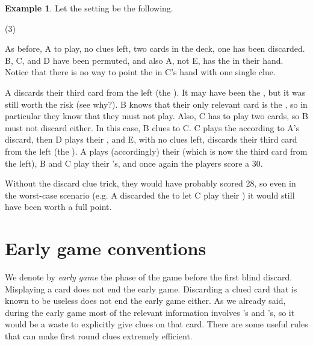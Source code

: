 \documentclass[a4paper]{article}
\theoremstyle{plain}
\theoremstyle{definition}
\newtheorem{example}[theorem]{Example}
\begin{document}
\begin{example}
	
	Let the setting be the following.
	
	\begin{tasks}(3)
		\task[+]      
		\task[A]    
		\task[B]    
		\task[C]    
		\task[D]    
		\task[E]    
	\end{tasks}
	
	As before, A to play, no clues left, two cards in the deck, one  has been discarded. B, C, and D have been permuted, and also A, not E, has the  in their hand. Notice that there is no way to point the  in C's hand with one single clue.
	
	A discards their third card from the left (the ). It may have been the , but it was still worth the risk (see why?). B knows that their only relevant card is the , so in particular they know that they must not play. Also, C has to play two cards, so B must not discard either. In this case, B clues  to C. C plays the  according to A's discard, then D plays their , and E, with no clues left, discards their third card from the left (the ). A plays (accordingly) their  (which is now the third card from the left), B and C play their 's, and once again the players score a 30.
\end{example}

Without the discard clue trick, they would have probably scored 28, so even in the worst-case scenario (e.g. A discarded the  to let C play their ) it would still have been worth a full point.

\section{Early game conventions}
\label{sec:earlygame}

We denote by \textit{early game} the phase of the game before the first blind discard. Misplaying a card does not end the early game. Discarding a clued card that is known to be useless does not end the early game either. As we already said, during the early game most of the relevant information involves 's and 's, so it would be a waste to explicitly give clues on that card. There are some useful rules that can make first round clues extremely efficient.
\end{document}
